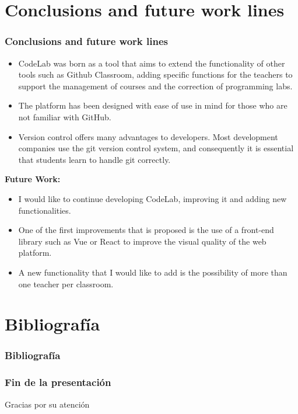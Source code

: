 \documentclass{beamer}
\begin{document}

\section{Conclusions and future work lines}
\begin{frame}[allowframebreaks]
  \frametitle{Conclusions and future work lines}

  \begin{itemize}
    \item CodeLab was born as a tool that aims to extend the functionality of other tools such as Github 
          Classroom, adding specific functions for the teachers to support the management of courses and 
          the correction of programming labs.
    \item The platform has been designed with ease of use in mind for those who are not familiar with GitHub.
    \item Version control offers many advantages to developers. Most development companies use the git 
          version control system, and consequently it is essential that students learn to handle git correctly.
  \end{itemize}
  \framebreak
  
  {\bf Future Work:}
  \begin{itemize}
    \item I would like to continue developing CodeLab, improving it and adding new functionalities. 
    \item One of the first improvements that is proposed is the use of a front-end library such as Vue 
          or React to improve the visual quality of the web platform.
    \item A new functionality that I would like to add is the possibility of more than one teacher per classroom.
  \end{itemize}
\end{frame}


\section{Bibliografía}
\begin{frame}[allowframebreaks]
  \frametitle{Bibliografía}
  
  
  \nocite{*}
\end{frame}

\begin{frame}
  \frametitle{Fin de la presentación}
  \begin{center}
    \Huge{Gracias por su atención}
  \end{center}
\end{frame}
\end{document}
